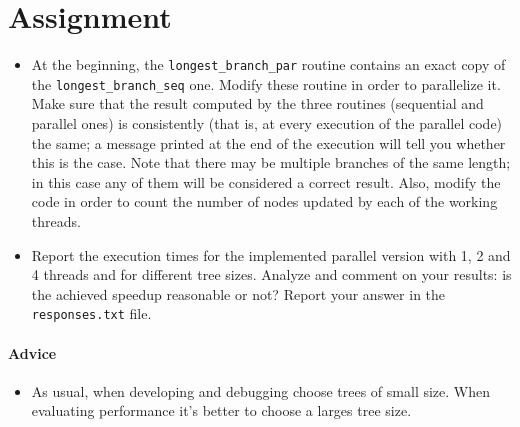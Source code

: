 \documentclass{article}
\begin{document}
\section{Assignment}
\begin{itemize}
\item {\huge \Keyboard} At the beginning, the
  \texttt{longest\_branch\_par} routine contains an exact copy of the
  \texttt{longest\_branch\_seq} one. Modify these routine in order to
  parallelize it.  Make sure that the result computed by the three
  routines (sequential and parallel ones) is consistently (that is, at
  every execution of the parallel code) the same; a message printed at
  the end of the execution will tell you whether this is the
  case. Note that there may be multiple branches of the same length;
  in this case any of them will be considered a correct result. Also,
  modify the code in order to count the number of nodes updated by
  each of the working threads.
\item \smallpencil Report the execution times for the implemented
  parallel version with 1, 2 and 4 threads and for different tree
  sizes. Analyze and comment on your results: is the achieved speedup
  reasonable or not? Report your answer in the \texttt{responses.txt}
  file.
\end{itemize}


\paragraph{Advice}
\begin{itemize}
\item As usual, when developing and debugging choose trees of small
  size. When evaluating performance it's better to choose a larges
  tree size.
\end{itemize}
\end{document}
